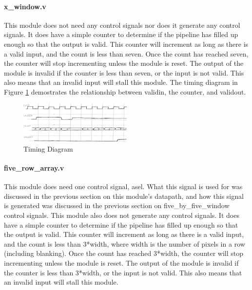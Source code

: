 \paragraph{x\_window.v}
This module does not need any control signals nor does it generate any control 
signals. It does have a simple counter to determine if the pipeline has filled 
up enough so that the output is valid. This counter will increment as long as 
there is a valid input, and the count is less than seven. Once the count has 
reached seven, the counter will stop incrementing unless the module is reset. 
The output of the module is invalid if the counter is less than seven, or the 
input is not valid. This also means that an invalid input will stall this 
module. The timing diagram in Figure \ref{fig:timing_1} demostrates the 
relationship between validin, the counter, and validout.

\begin{figure}
    \includegraphics[width=0.5\textwidth]{processed_image_pngs/timing_1.png}
    \caption{Timing Diagram}
    \label{fig:timing_1}
\end{figure}



\paragraph{five\_row\_array.v}
This module does need one control signal, asel. What this signal is used for was discussed in the previous section on this module's datapath, and how this signal is generated was discussed in the previous section on five\_by\_five\_window control signals. This module also does not generate any control signals. It does have a simple counter to determine if the pipeline has filled up enough so that the output is valid. This counter will increment as long as there is a valid input, and the count is less than 3*width, where width is the number of pixels in a row (including blanking). Once the count has reached 3*width, the counter will stop incrementing unless the module is reset. The output of the module is invalid if the counter is less than 3*width, or the input is not valid. This also means that an invalid input will stall this module.

